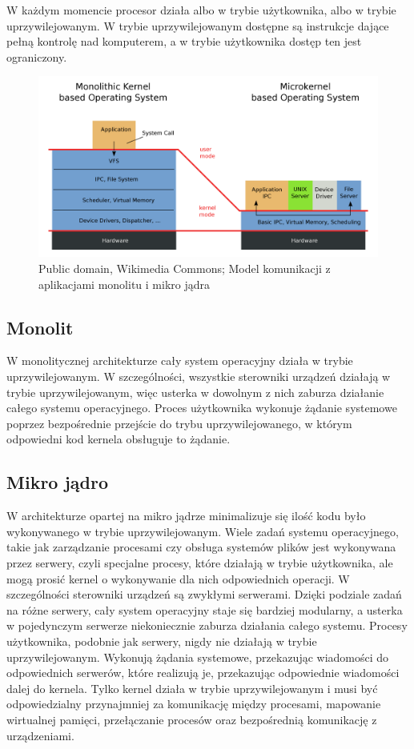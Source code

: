 W każdym momencie procesor działa albo w trybie użytkownika, albo w trybie uprzywilejowanym. W trybie uprzywilejowanym dostępne są instrukcje dające pełną kontrolę nad komputerem, a w trybie użytkownika dostęp ten jest ograniczony.

\begin{figure}[H]  
    \centering
    \includegraphics[width=12cm]{chapters/sysopy/monolit/os-structure}
\caption{Public domain, Wikimedia Commons; Model komunikacji z aplikacjami monolitu i mikro jądra}
\end{figure}

\subsection{Monolit}
W monolitycznej architekturze cały system operacyjny działa w trybie uprzywilejowanym. W szczególności, wszystkie sterowniki urządzeń działają w trybie uprzywilejowanym, więc usterka w dowolnym z nich zaburza działanie całego systemu operacyjnego. Proces użytkownika wykonuje żądanie systemowe poprzez bezpośrednie przejście do trybu uprzywilejowanego, w którym odpowiedni kod kernela obsługuje to żądanie.

\subsection{Mikro jądro}
W architekturze opartej na mikro jądrze minimalizuje się ilość kodu było wykonywanego w trybie uprzywilejowanym. Wiele zadań systemu operacyjnego, takie jak zarządzanie procesami czy obsługa systemów plików jest wykonywana przez serwery, czyli specjalne procesy, które działają w trybie użytkownika, ale mogą prosić kernel o wykonywanie dla nich odpowiednich operacji. W szczególności sterowniki urządzeń są zwykłymi serwerami. Dzięki podziale zadań na różne serwery, cały system operacyjny staje się bardziej modularny, a usterka w pojedynczym serwerze niekoniecznie zaburza działania całego systemu. Procesy użytkownika, podobnie jak serwery, nigdy nie działają w trybie uprzywilejowanym. Wykonują żądania systemowe, przekazując wiadomości do odpowiednich serwerów, które realizują je, przekazując odpowiednie wiadomości dalej do kernela. Tylko kernel działa w trybie uprzywilejowanym i musi być odpowiedzialny przynajmniej za komunikację między procesami, mapowanie wirtualnej pamięci, przełączanie procesów oraz bezpośrednią komunikację z urządzeniami.